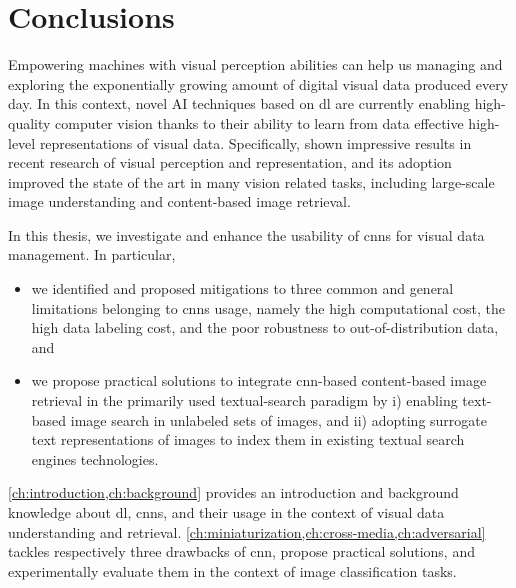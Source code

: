 
\chapter{Conclusions}
\label{ch:conclusion}

Empowering machines with visual perception abilities can help us managing and exploring the exponentially growing amount of digital visual data produced every day.
In this context, novel AI techniques based on \acrlong{dl} are currently enabling high-quality computer vision thanks to their ability to learn from data effective high-level representations of visual data.
Specifically,  shown impressive results in recent research of visual perception and representation, and its adoption improved the state of the art in many vision related tasks, including large-scale image understanding and content-based image retrieval.

In this thesis, we investigate and enhance the usability of \glspl{cnn} for visual data management.
In particular,
\begin{itemize}
    \item we identified and proposed mitigations to three common and general limitations belonging to \glspl{cnn} usage, namely the high computational cost, the high data labeling cost, and the poor robustness to out-of-distribution data, and
    \item we propose practical solutions to integrate \gls{cnn}-based content-based image retrieval in the primarily used textual-search paradigm by %
i) enabling text-based image search in unlabeled sets of images, and %
ii) adopting surrogate text representations of images to index them in existing textual search engines technologies.
\end{itemize}

\ref{ch:introduction,ch:background} provides an introduction and background knowledge about \acrlong{dl}, \glspl{cnn}, and their usage in the context of visual data understanding and retrieval.
\ref{ch:miniaturization,ch:cross-media,ch:adversarial} tackles respectively three drawbacks of \gls{cnn}, propose practical solutions, and experimentally evaluate them in the context of image classification tasks.

